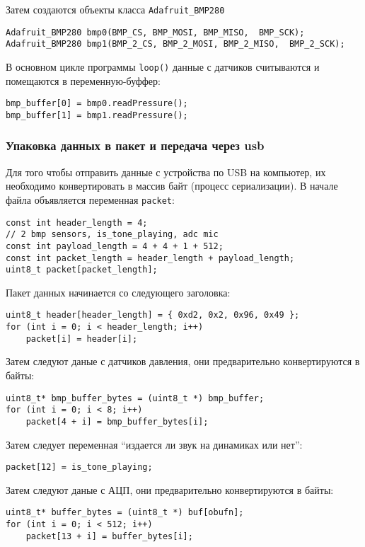 \documentclass[../main.tex]{subfiles}
\begin{document}
Затем создаются объекты класса \verb|Adafruit_BMP280| 
\begin{lstlisting}
Adafruit_BMP280 bmp0(BMP_CS, BMP_MOSI, BMP_MISO,  BMP_SCK);
Adafruit_BMP280 bmp1(BMP_2_CS, BMP_2_MOSI, BMP_2_MISO,  BMP_2_SCK);
\end{lstlisting}

В основном цикле программы \verb|loop()| данные с датчиков считываются и помещаются в переменную-буффер:

\begin{lstlisting}
bmp_buffer[0] = bmp0.readPressure();
bmp_buffer[1] = bmp1.readPressure();
\end{lstlisting}

\subsubsection{Упаковка данных в пакет и передача через usb}
Для того чтобы отправить данные с устройства по USB на компьютер, их необходимо конвертировать в массив байт (процесс сериализации). В начале файла объявляется переменная \verb|packet|:

\begin{lstlisting}
const int header_length = 4;
// 2 bmp sensors, is_tone_playing, adc mic
const int payload_length = 4 + 4 + 1 + 512; 
const int packet_length = header_length + payload_length;
uint8_t packet[packet_length];
\end{lstlisting}

Пакет данных начинается со следующего заголовка:
\begin{lstlisting}
uint8_t header[header_length] = { 0xd2, 0x2, 0x96, 0x49 };
for (int i = 0; i < header_length; i++)
    packet[i] = header[i];
\end{lstlisting}

Затем следуют даные с датчиков давления, они предварительно конвертируются в байты:
\begin{lstlisting}
uint8_t* bmp_buffer_bytes = (uint8_t *) bmp_buffer;
for (int i = 0; i < 8; i++)
    packet[4 + i] = bmp_buffer_bytes[i];
\end{lstlisting}

Затем следует переменная ``издается ли звук на динамиках или нет'':
\begin{lstlisting}
packet[12] = is_tone_playing;
\end{lstlisting}

Затем следуют даные с АЦП, они предварительно конвертируются в байты:
\begin{lstlisting}
uint8_t* buffer_bytes = (uint8_t *) buf[obufn];
for (int i = 0; i < 512; i++)
    packet[13 + i] = buffer_bytes[i];
\end{lstlisting}
\end{document}
